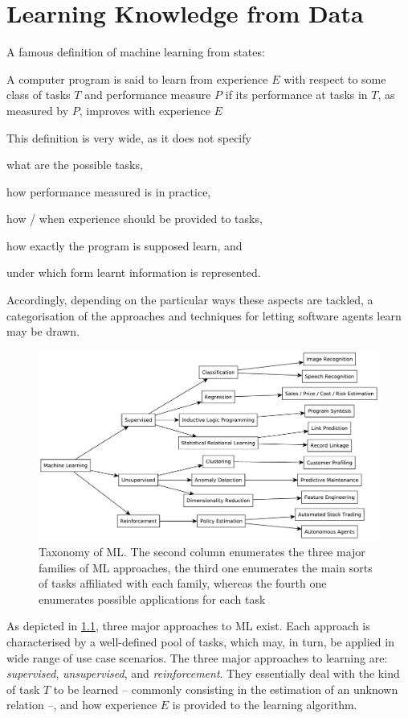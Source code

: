 \documentclass[12pt,a4paper,openright,twoside]{book}
\begin{document}
\chapter{Learning Knowledge from Data}\label{chap:learning}

A famous definition of machine learning from \cite{Mitchell1997} states:
%
\begin{displayquote}
    A computer program is said to learn from experience $E$ with respect to some class of tasks $T$ and performance measure $P$ if its performance at tasks in $T$, as measured by $P$, improves with experience $E$
\end{displayquote}
%
This definition is very wide, as it does not specify
%
\begin{inlinelist}
    \item what are the possible tasks,
    \item how performance measured is in practice,
    \item how / when experience should be provided to tasks,
    \item how exactly the program is supposed learn, and
    \item under which form learnt information is represented.
\end{inlinelist}
%
Accordingly, depending on the particular ways these aspects are tackled, a categorisation of the approaches and techniques for letting software agents learn may be drawn.

\begin{figure}
    \centering
    \includegraphics[width=.8\linewidth]{figures/ml-taxonomy.pdf}
    \caption[Taxonomy of ML]{Taxonomy of ML. The second column enumerates the three major families of ML approaches, the third one enumerates the main sorts of tasks affiliated with each family, whereas the fourth one enumerates possible applications for each task}
    \label{fig:ml-taxonomy}
\end{figure}
%
As depicted in \cref{fig:ml-taxonomy}, three major approaches to ML exist.
%
Each approach is characterised by a well-defined pool of tasks, which may, in turn, be applied in wide range of use case scenarios.
%
The three major approaches to learning are: \emph{supervised}, \emph{unsupervised}, and \emph{reinforcement}.
%
They essentially deal with the kind of task $T$ to be learned -- commonly consisting in the estimation of an unknown relation --, and how experience $E$ is provided to the learning algorithm.
\end{document}
